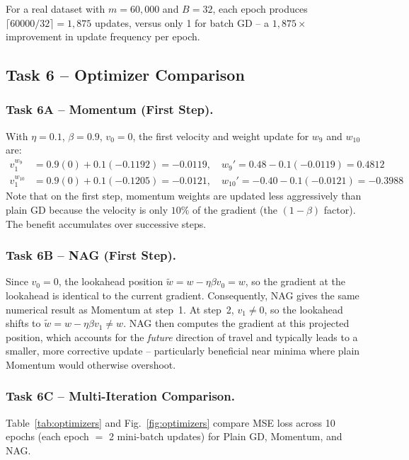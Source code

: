 \documentclass[runningheads]{llncs}
\begin{document}
For a real dataset with $m=60{,}000$ and $B=32$, each epoch produces
$\lceil60000/32\rceil = 1{,}875$ updates, versus only 1 for batch GD -- a
$1{,}875\times$ improvement in update frequency per epoch.

\subsection{Task 6 -- Optimizer Comparison}

\subsubsection{Task 6A -- Momentum (First Step).}

With $\eta=0.1$, $\beta=0.9$, $v_0=0$, the first velocity and weight update for
$w_9$ and $w_{10}$ are:
\begin{align*}
  v_1^{w_9}  &= 0.9(0) + 0.1(-0.1192) = -0.0119,\quad
  w_9'  = 0.48 - 0.1(-0.0119) = 0.4812\\
  v_1^{w_{10}} &= 0.9(0) + 0.1(-0.1205) = -0.0121,\quad
  w_{10}' = -0.40 - 0.1(-0.0121) = -0.3988
\end{align*}
Note that on the first step, momentum weights are updated less aggressively than
plain GD because the velocity is only $10\%$ of the gradient (the $(1-\beta)$
factor). The benefit accumulates over successive steps.

\subsubsection{Task 6B -- NAG (First Step).}

Since $v_0=0$, the lookahead position $\tilde{w}=w-\eta\beta v_0 = w$,
so the gradient at the lookahead is identical to the current gradient.
Consequently, NAG gives the same numerical result as Momentum at step~1.
At step~2, $v_1 \neq 0$, so the lookahead shifts to $\tilde{w} = w -
\eta\beta v_1 \neq w$. NAG then computes the gradient at this projected
position, which accounts for the \emph{future} direction of travel and
typically leads to a smaller, more corrective update -- particularly
beneficial near minima where plain Momentum would otherwise overshoot.

\subsubsection{Task 6C -- Multi-Iteration Comparison.}

Table~\ref{tab:optimizers} and Fig.~\ref{fig:optimizers} compare MSE loss across
10 epochs (each epoch $=$ 2 mini-batch updates) for Plain GD, Momentum, and NAG.
\end{document}
